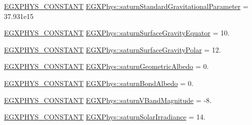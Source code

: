 \begin{DoxyCompactItemize}
\item 
\mbox{\hyperlink{group___e_g_x_phys-_constants-_macros_ga76980d288494ce1714c9ac68a95ba702}{E\+G\+X\+P\+H\+Y\+S\+\_\+\+C\+O\+N\+S\+T\+A\+NT}} \mbox{\hyperlink{group___e_g_x_phys-_constants-_astrophysics-_solar_system-_saturn-_bulk_ga290a47817afd6772a4e2a27caab6ee02}{E\+G\+X\+Phys\+::saturn\+Standard\+Gravitational\+Parameter}} = 37.\+931e15
\item 
\mbox{\hyperlink{group___e_g_x_phys-_constants-_macros_ga76980d288494ce1714c9ac68a95ba702}{E\+G\+X\+P\+H\+Y\+S\+\_\+\+C\+O\+N\+S\+T\+A\+NT}} \mbox{\hyperlink{group___e_g_x_phys-_constants-_astrophysics-_solar_system-_saturn-_bulk_gaadcbb6c11874c32eae697d97ed52dd93}{E\+G\+X\+Phys\+::saturn\+Surface\+Gravity\+Equator}} = 10.
\item 
\mbox{\hyperlink{group___e_g_x_phys-_constants-_macros_ga76980d288494ce1714c9ac68a95ba702}{E\+G\+X\+P\+H\+Y\+S\+\_\+\+C\+O\+N\+S\+T\+A\+NT}} \mbox{\hyperlink{group___e_g_x_phys-_constants-_astrophysics-_solar_system-_saturn-_bulk_ga3b5fcd3fd6c84085b5360b3a6b54ae5f}{E\+G\+X\+Phys\+::saturn\+Surface\+Gravity\+Polar}} = 12.
\item 
\mbox{\hyperlink{group___e_g_x_phys-_constants-_macros_ga76980d288494ce1714c9ac68a95ba702}{E\+G\+X\+P\+H\+Y\+S\+\_\+\+C\+O\+N\+S\+T\+A\+NT}} \mbox{\hyperlink{group___e_g_x_phys-_constants-_astrophysics-_solar_system-_saturn-_bulk_ga7ba3c29bc265b7b07bd8aa66b6e2f881}{E\+G\+X\+Phys\+::saturn\+Geometric\+Albedo}} = 0.
\item 
\mbox{\hyperlink{group___e_g_x_phys-_constants-_macros_ga76980d288494ce1714c9ac68a95ba702}{E\+G\+X\+P\+H\+Y\+S\+\_\+\+C\+O\+N\+S\+T\+A\+NT}} \mbox{\hyperlink{group___e_g_x_phys-_constants-_astrophysics-_solar_system-_saturn-_bulk_ga15adee1fd2e0b08862bd3e216101454a}{E\+G\+X\+Phys\+::saturn\+Bond\+Albedo}} = 0.
\item 
\mbox{\hyperlink{group___e_g_x_phys-_constants-_macros_ga76980d288494ce1714c9ac68a95ba702}{E\+G\+X\+P\+H\+Y\+S\+\_\+\+C\+O\+N\+S\+T\+A\+NT}} \mbox{\hyperlink{group___e_g_x_phys-_constants-_astrophysics-_solar_system-_saturn-_bulk_ga6abf2d485e27e953fd2268bf1bf33bcc}{E\+G\+X\+Phys\+::saturn\+V\+Band\+Magnitude}} = -\/8.
\item 
\mbox{\hyperlink{group___e_g_x_phys-_constants-_macros_ga76980d288494ce1714c9ac68a95ba702}{E\+G\+X\+P\+H\+Y\+S\+\_\+\+C\+O\+N\+S\+T\+A\+NT}} \mbox{\hyperlink{group___e_g_x_phys-_constants-_astrophysics-_solar_system-_saturn-_bulk_ga3a3e3302f9786d2172ec1121b4251c57}{E\+G\+X\+Phys\+::saturn\+Solar\+Irradiance}} = 14.

\end{DoxyCompactItemize}
